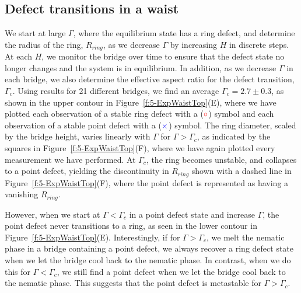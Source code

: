 \subsection{Defect transitions in a waist}
We start at large $\Gamma$, where the equilibrium state has a ring defect, and determine the radius of the ring, $R_{ring}$, as we decrease $\Gamma$ by increasing $H$ in discrete steps.
At each $H$, we monitor the bridge over time to ensure that the defect state no longer changes and the system is in equilibrium.
In addition, as we decrease $\Gamma$ in each bridge, we also determine the effective aspect ratio for the defect transition, $\Gamma_c$.
Using results for 21 different bridges, we find an average $\Gamma_c = 2.7 \pm 0.3$, as shown in the upper contour in Figure~\ref{f:5-ExpWaistTop}(E), where we have plotted each observation of a stable ring defect with a (${\color{red} \circ}$) symbol and each observation of a stable point defect with a (${\color{blue} \times}$) symbol.
The ring diameter, scaled by the bridge height, varies linearly with $\Gamma$ for $\Gamma > \Gamma_c$, as indicated by the squares in Figure~\ref{f:5-ExpWaistTop}(F), where we have again plotted every measurement we have performed.
At $\Gamma_c$, the  ring becomes unstable, and collapses to a point defect, yielding the discontinuity in $R_{ring}$ shown with a dashed line in Figure~\ref{f:5-ExpWaistTop}(F), where the point defect is represented as having a vanishing $R_{ring}$.

However, when we start at $\Gamma < \Gamma_c$ in a point defect state and increase $\Gamma$, the point defect never transitions to a ring, as seen in the lower contour in Figure~\ref{f:5-ExpWaistTop}(E).
Interestingly, if for $\Gamma > \Gamma_c$, we melt the nematic phase in a bridge containing a point defect, we always recover a ring defect state when we let the bridge cool back to the nematic phase.
In contrast, when we do this for $\Gamma < \Gamma_c$, we still find a point defect when we let the bridge cool back to the nematic phase.
This suggests that the point defect is metastable for $\Gamma > \Gamma_c$.


